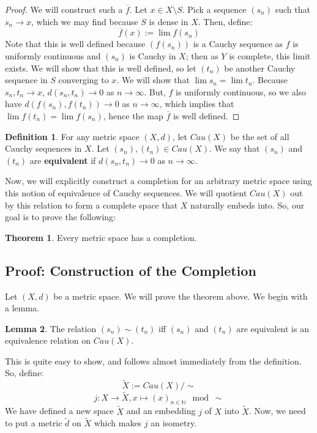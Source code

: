 \documentclass[11pt, oneside]{amsart}   	%
\theoremstyle{definition}
\newtheorem{definition}{Definition}[section]
\newtheorem{theorem}{Theorem}[section]
\newtheorem{lemma}[theorem]{Lemma}
\begin{document}
	\begin{proof}
		We will construct such a $\overline f$. Let $x\in X\setminus S$. Pick a sequence $(s_n)$ such that $s_n\rightarrow x$, which we may find because 
		$S$ is dense in $X$. Then, define:
		$$
			\overline f(x) := \lim f(s_n)
		$$
		Note that this is well defined because $(f(s_n))$ is a Cauchy sequence as $f$ is uniformly continuous and $(s_n)$ is Cauchy in $X$; then as $Y$ is 
		complete, this limit exists. We will show that this is well defined, so let $(t_n)$ be another Cauchy sequence in $S$ converging to $x$. We will show 
		that $\lim s_n = \lim t_n$. Because $s_n, t_n\rightarrow x$, $d(s_n, t_n)\rightarrow 0$ as $n\rightarrow\infty$. But, $f$ is uniformly continuous, so we 
		also have $d(f(s_n), f(t_n))\rightarrow 0$ as $n\rightarrow\infty$, which implies that $\lim f(t_n) = \lim f(s_n)$, hence the map $\overline f$ is well 
		defined.
	\end{proof}
	
	\begin{definition}
		For any metric space $(X, d)$, let $Cau(X)$ be the set of all Cauchy sequences in $X$. Let $(s_n), (t_n)\in Cau(X)$. We say that $(s_n)$ and $(t_n)$ 
		are \textbf{equivalent} if $d(s_n, t_n)\rightarrow 0$ as $n\rightarrow\infty$. 
	\end{definition}
	
	Now, we will explicitly construct a completion for an arbitrary metric space using this notion of equivalence of Cauchy sequences. We will quotient $Cau(X)$ out 
	by this relation to form a complete space that $X$ naturally embeds into. So, our goal is to prove the following:
	
	\begin{theorem}
		Every metric space has a completion.
	\end{theorem}
	
	\subsection{Proof: Construction of the Completion}
	
	Let $(X, d)$ be a metric space. We will prove the theorem above. We begin with a lemma.
	
	\begin{lemma}
		The relation $(s_n)\sim (t_n)$ iff $(s_n)$ and $(t_n)$ are equivalent is an equivalence relation on $Cau(X)$.
	\end{lemma}
	
	This is quite easy to show, and follows almost immediately from the definition. So, define:
	$$
		\tilde X := Cau(X) / \sim
	$$
	$$
		j : X\rightarrow\tilde X, x\mapsto (x)_{n\in\mathbb N}\mod\sim
	$$
	We have defined a new space $\tilde X$ and an embedding $j$ of $X$ into $\tilde X$. Now, we need to put a metric $\tilde d$ on 
	$\tilde X$ which makes $j$ an isometry.
	
\end{document}
